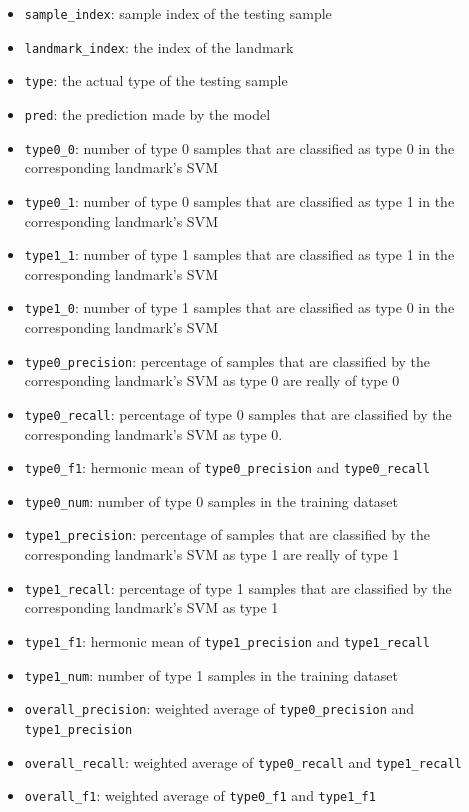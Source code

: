 \documentclass[10pt,letterpaper]{article}
\providecommand{\tightlist}{%
  \setlength{\itemsep}{0pt}\setlength{\parskip}{0pt}}
\begin{document}
\begin{itemize}
\tightlist
\item
  \texttt{sample\_index}: sample index of the testing sample
\item
  \texttt{landmark\_index}: the index of the landmark
\item
  \texttt{type}: the actual type of the testing sample
\item
  \texttt{pred}: the prediction made by the model
\item
  \texttt{type0\_0}: number of type 0 samples that are classified as
  type 0 in the corresponding landmark's SVM
\item
  \texttt{type0\_1}: number of type 0 samples that are classified as
  type 1 in the corresponding landmark's SVM
\item
  \texttt{type1\_1}: number of type 1 samples that are classified as
  type 1 in the corresponding landmark's SVM
\item
  \texttt{type1\_0}: number of type 1 samples that are classified as
  type 0 in the corresponding landmark's SVM
\item
  \texttt{type0\_precision}: percentage of samples that are classified
  by the corresponding landmark's SVM as type 0 are really of type 0
\item
  \texttt{type0\_recall}: percentage of type 0 samples that are
  classified by the corresponding landmark's SVM as type 0.
\item
  \texttt{type0\_f1}: hermonic mean of \texttt{type0\_precision} and
  \texttt{type0\_recall}
\item
  \texttt{type0\_num}: number of type 0 samples in the training dataset
\item
  \texttt{type1\_precision}: percentage of samples that are classified
  by the corresponding landmark's SVM as type 1 are really of type 1
\item
  \texttt{type1\_recall}: percentage of type 1 samples that are
  classified by the corresponding landmark's SVM as type 1
\item
  \texttt{type1\_f1}: hermonic mean of \texttt{type1\_precision} and
  \texttt{type1\_recall}
\item
  \texttt{type1\_num}: number of type 1 samples in the training dataset
\item
  \texttt{overall\_precision}: weighted average of
  \texttt{type0\_precision} and \texttt{type1\_precision}
\item
  \texttt{overall\_recall}: weighted average of \texttt{type0\_recall}
  and \texttt{type1\_recall}
\item
  \texttt{overall\_f1}: weighted average of \texttt{type0\_f1} and
  \texttt{type1\_f1}
\end{itemize}
\end{document}
